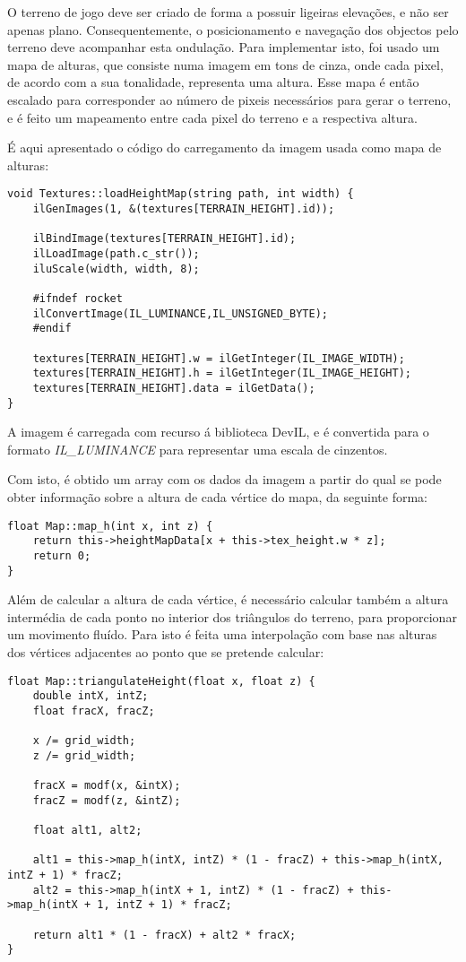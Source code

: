 O terreno de jogo deve ser criado de forma a possuir ligeiras elevações, e não ser apenas plano. Consequentemente, o posicionamento e navegação dos objectos pelo terreno deve acompanhar esta ondulação. Para implementar isto, foi usado um mapa de alturas, que consiste numa imagem em tons de cinza, onde cada pixel, de acordo com a sua tonalidade, representa uma altura.
Esse mapa é então escalado para corresponder ao número de pixeis necessários para gerar o terreno, e é feito um mapeamento entre cada pixel do terreno e a respectiva altura.

É aqui apresentado o código do carregamento da imagem usada como mapa de alturas:

\begin{lstlisting}
void Textures::loadHeightMap(string path, int width) {
	ilGenImages(1, &(textures[TERRAIN_HEIGHT].id));

	ilBindImage(textures[TERRAIN_HEIGHT].id);
	ilLoadImage(path.c_str());
	iluScale(width, width, 8);

	#ifndef rocket
	ilConvertImage(IL_LUMINANCE,IL_UNSIGNED_BYTE);
	#endif
	
	textures[TERRAIN_HEIGHT].w = ilGetInteger(IL_IMAGE_WIDTH);
	textures[TERRAIN_HEIGHT].h = ilGetInteger(IL_IMAGE_HEIGHT);
	textures[TERRAIN_HEIGHT].data = ilGetData();
}
\end{lstlisting}

A imagem é carregada com recurso á biblioteca DevIL, e é convertida para o formato \emph{IL\_LUMINANCE} para representar uma escala de cinzentos.

Com isto, é obtido um array com os dados da imagem a partir do qual se pode obter informação sobre a altura de cada vértice do mapa, da seguinte forma:

\begin{lstlisting}[caption=Função de cálculo da altura de um vértice do mapa]
float Map::map_h(int x, int z) {
	return this->heightMapData[x + this->tex_height.w * z];
	return 0;
}
\end{lstlisting}

Além de calcular a altura de cada vértice, é necessário calcular também a altura intermédia de cada ponto no interior dos triângulos do terreno, para proporcionar um movimento fluído. Para isto é feita uma interpolação com base nas alturas dos vértices adjacentes ao ponto que se pretende calcular:

\begin{lstlisting}[caption=Interpolação da altura de um ponto]
float Map::triangulateHeight(float x, float z) {
	double intX, intZ;
	float fracX, fracZ;

	x /= grid_width;
	z /= grid_width;

	fracX = modf(x, &intX);
	fracZ = modf(z, &intZ);

	float alt1, alt2;

	alt1 = this->map_h(intX, intZ) * (1 - fracZ) + this->map_h(intX, intZ + 1) * fracZ;
	alt2 = this->map_h(intX + 1, intZ) * (1 - fracZ) + this->map_h(intX + 1, intZ + 1) * fracZ;

	return alt1 * (1 - fracX) + alt2 * fracX;
}
\end{lstlisting}

